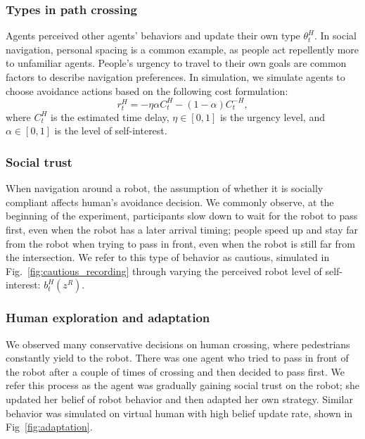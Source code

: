 \documentclass[letterpaper, 10 pt, conference]{ieeeconf}  %
\begin{document}
\subsubsection{Types in path crossing}
Agents perceived other agents' behaviors and update their own type $\theta^H_t$. In 
social navigation, personal spacing is a common example, as people act 
repellently more to unfamiliar agents. People's urgency to travel to their own 
goals are common factors to describe navigation preferences. In simulation, we 
simulate agents to choose avoidance actions based on the following cost formulation:
\begin{equation}
  r^H_t = -\eta \alpha C^H_t  -(1-\alpha) C^{-H}_t,
\end{equation}
where $C^H_t$ is the estimated time delay, $\eta \in [0,1]$ is the urgency 
level, and $\alpha \in [0,1]$ is the level of self-interest.
\subsubsection{Social trust}
When navigation around a robot, the assumption of whether it is socially 
compliant affects human's avoidance decision. We commonly observe, at the 
beginning of the experiment, participants slow down to wait for the robot to 
pass first, even when the robot has a later arrival 
timing; people speed up and stay far from the robot when trying to pass in 
front, even when the robot is still far from the intersection. 
We refer to this type of behavior as cautious, simulated in 
Fig.~\ref{fig:cautious_recording} through 
varying the perceived robot level of 
self-interest: $b^H_t(z^R)$. 
\subsubsection{Human exploration and adaptation}
We observed many conservative decisions on human crossing, where 
pedestrians constantly yield to the robot. 
There was one agent who tried to pass in front of the 
robot after a couple of times of crossing and then decided to pass first. We 
refer this process as the agent was gradually gaining social trust on the 
robot; she updated her belief of robot behavior and then adapted her own 
strategy. Similar behavior was simulated on virtual human with high belief 
update rate, shown in Fig~\ref{fig:adaptation}.   
\vspace{-.4em}
\end{document}
